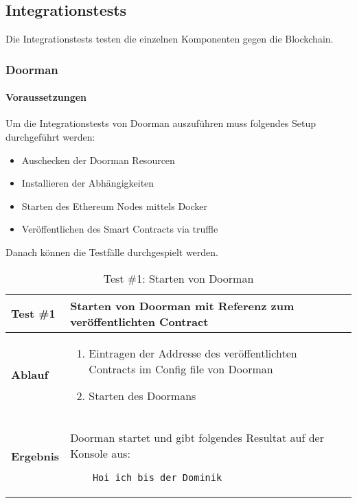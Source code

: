 \subsection{Integrationstests}
Die Integrationstests testen die einzelnen Komponenten gegen die Blockchain. 

\subsubsection{Doorman}

\paragraph{Voraussetzungen}

Um die Integrationstests von Doorman auszuführen muss folgendes Setup durchgeführt werden:

\begin{itemize}
    \item Auschecken der Doorman Resourcen
    \item Installieren der Abhängigkeiten
    \item Starten des Ethereum Nodes mittels Docker
    \item Veröffentlichen des Smart Contracts via truffle 
\end{itemize}

Danach können die Testfälle durchgespielt werden.
    
\begin{table}[H]
\centering
\caption{Test \#1: Starten von Doorman}
\label{my-label}
\begin{tabular}{@{}L{1.6cm}L{11cm}@{}}
\toprule
\textbf{Test \#1}
& Starten von Doorman mit Referenz zum veröffentlichten Contract
\\ \midrule
\textbf{Ablauf}
& 
\begin{enumerate}
    \item Eintragen der Addresse des veröffentlichten Contracts im Config file von Doorman
    \item Starten des Doormans
\end{enumerate}
\\ \midrule
\textbf{Ergebnis}
& Doorman startet und gibt folgendes Resultat auf der Konsole aus:
\begin{verbatim}
    Hoi ich bis der Dominik
\end{verbatim}
\\ \bottomrule
\end{tabular}
\end{table}

